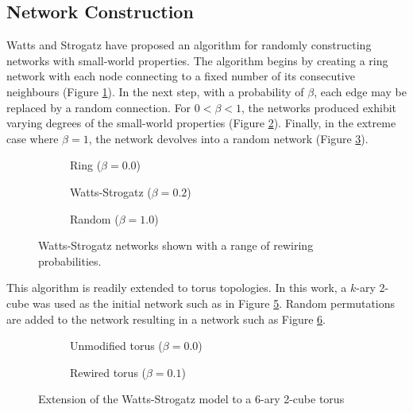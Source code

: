 		\subsection{Network Construction}
		
			Watts and Strogatz have proposed an algorithm for randomly constructing
			networks with small-world properties\cite{watts98}. The algorithm begins
			by creating a ring network with each node connecting to a fixed number of
			its consecutive neighbours (Figure \ref{fig:ringNetworkB0}). In the next
			step, with a probability of $\beta$, each edge may be replaced by a random
			connection. For $0 < \beta < 1$, the networks produced exhibit varying
			degrees of the small-world properties (Figure \ref{fig:ringNetworkB02}).
			Finally, in the extreme case where $\beta=1$, the network devolves into a
			random network (Figure \ref{fig:ringNetworkB1}).
			
			\begin{figure}
				\center
				\begin{subfigure}[t]{0.3\textwidth}
					\center
					
					\caption{Ring ($\beta = 0.0$)}
					\label{fig:ringNetworkB0}
				\end{subfigure}
				\begin{subfigure}[t]{0.3\textwidth}
					\center
					
					\caption{Watts-Strogatz ($\beta = 0.2$)}
					\label{fig:ringNetworkB02}
				\end{subfigure}
				\begin{subfigure}[t]{0.3\textwidth}
					\center
					
					\caption{Random ($\beta = 1.0$)}
					\label{fig:ringNetworkB1}
				\end{subfigure}
				
				\caption{Watts-Strogatz networks shown with a range of rewiring
				probabilities.}
				\label{fig:ringNetwork}
			\end{figure}
			
			This algorithm is readily extended to torus topologies. In this work, a
			$k$-ary 2-cube was used as the initial network such as in Figure
			\ref{fig:torusNetworkB0}. Random permutations are added to the network
			resulting in a network such as Figure \ref{fig:torusNetworkB01}.
			
			\begin{figure}
				\center
				\begin{subfigure}[t]{0.45\textwidth}
					\center
					
					\caption{Unmodified torus ($\beta=0.0$)}
					\label{fig:torusNetworkB0}
				\end{subfigure}
				\begin{subfigure}[t]{0.45\textwidth}
					\center
					
					\caption{Rewired torus ($\beta=0.1$)}
					\label{fig:torusNetworkB01}
				\end{subfigure}
				
				\caption{Extension of the Watts-Strogatz model to a 6-ary 2-cube torus}
				\label{fig:torusNetwork}
			\end{figure}
			
